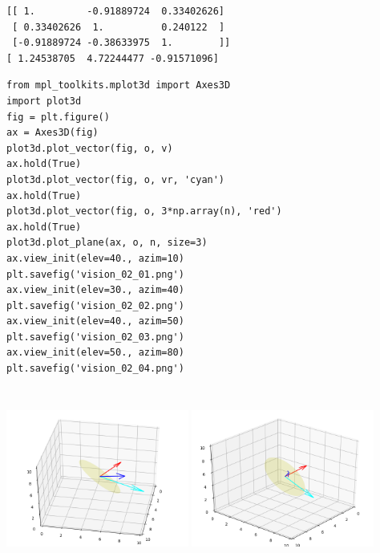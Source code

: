 \documentclass[12pt,fleqn]{article}\usepackage{../../common}
\begin{document}
\begin{verbatim}
[[ 1.         -0.91889724  0.33402626]
 [ 0.33402626  1.          0.240122  ]
 [-0.91889724 -0.38633975  1.        ]]
[ 1.24538705  4.72244477 -0.91571096]
\end{verbatim}

\begin{verbatim}
from mpl_toolkits.mplot3d import Axes3D
import plot3d
fig = plt.figure()
ax = Axes3D(fig)
plot3d.plot_vector(fig, o, v)
ax.hold(True)
plot3d.plot_vector(fig, o, vr, 'cyan')
ax.hold(True)
plot3d.plot_vector(fig, o, 3*np.array(n), 'red')
ax.hold(True)
plot3d.plot_plane(ax, o, n, size=3)
ax.view_init(elev=40., azim=10)
plt.savefig('vision_02_01.png')
ax.view_init(elev=30., azim=40)
plt.savefig('vision_02_02.png')
ax.view_init(elev=40., azim=50)
plt.savefig('vision_02_03.png')
ax.view_init(elev=50., azim=80)
plt.savefig('vision_02_04.png')
\end{verbatim}

\includegraphics[height=6cm,width=6cm]{vision_02_01.png}
\includegraphics[height=6cm,width=6cm]{vision_02_02.png}
\end{document}
